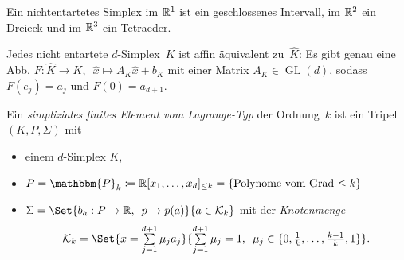 \documentclass{cheat-sheet}
\DeclareMathOperator{\GL}{GL}
\newcommand{\Poly}{\mathbbm{P}} %
\begin{document}
\begin{bspe}
  Ein nichtentartetes Simplex im $\mathbb{R}^1$ ist ein geschlossenes Intervall, im $\mathbb{R}^2$ ein Dreieck und im $\mathbb{R}^3$ ein Tetraeder.
\end{bspe}

\begin{lem}
  Jedes nicht entartete $d$-Simplex~$K$ ist affin äquivalent zu~$\hat{K}$:
  Es gibt genau eine Abb. $F : \hat{K} \to K, \enspace \hat{x} \mapsto A_K \hat{x} + b_K$ mit einer Matrix $A_K \in \GL(d)$, sodass $F(e_j) = a_j$ und $F(0) = a_{d+1}$.
\end{lem}

\begin{defn}
  Ein \emph{simpliziales finites Element vom Lagrange-Typ} der Ordnung~$k$ ist ein Tripel $(K, P, \Sigma)$ mit
  \begin{itemize}
    \item einem $d$-Simplex $K$,
    \item $P = \Poly_k \coloneqq \R[x_1, \ldots, x_d]_{\leq k} = \{ \text{Polynome vom Grad $\leq k$} \}$
    \item $\Sigma = \Set{b_a : P \to \R, \enspace p \mapsto p(a)}{a \in \mathcal{K}_k}$ mit der \textit{Knotenmenge}
    \[
      \mathcal{K}_k = \Set{x = \sum_{j=1}^{d+1} \mu_j a_j}{\sum_{j=1}^{d+1} \mu_j = 1, \enspace \mu_j \in \{ 0, \tfrac{1}{k}, \ldots, \tfrac{k-1}{k}, 1 \}}.
    \]
  \end{itemize}
\end{defn}
\end{document}
